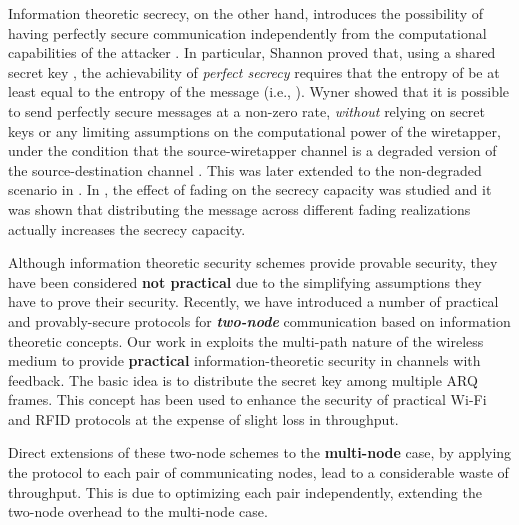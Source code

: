 \documentclass[10pt,letterpaper,conference]{IEEEtran}
\begin{document}
Information theoretic secrecy, on the other hand, introduces the possibility of
having perfectly secure communication independently from the computational
capabilities of the attacker \cite{Shannon49,Wyner75,Maurer93,Gopala06,Tang07,Omar09, Sabagh10, Sabagh11,forensic11,Elmorsy,Arora2009,karim_j,aly_j,multinode_demo}. In particular, Shannon \cite{Shannon49} proved
that, using a shared secret key ,  the achievability of \emph{perfect
secrecy} requires that the entropy of  be at least equal to the entropy of
the message  (i.e., ). Wyner showed that it is possible to
send perfectly secure messages at a non-zero rate, \textit{without} relying on
secret keys or any limiting assumptions on the computational power of the
wiretapper, under the condition that the source-wiretapper channel is a degraded
version of the source-destination channel \cite{Wyner75}. This was later
extended to the non-degraded scenario in \cite{Maurer93}. In
\cite{Gopala06,Tang07}, the effect of fading on the secrecy capacity was studied
and it was shown that distributing the message across different fading
realizations actually increases the secrecy capacity.

Although information theoretic security schemes provide provable security, they
have been considered \textbf{not practical} due to the simplifying assumptions
they have to prove their security. Recently, we have introduced a number
of practical and provably-secure protocols for \textbf{\emph{two-node}}
communication based on information theoretic concepts. Our work in \cite{Omar09,
Sabagh10, Sabagh11,forensic11} exploits the multi-path nature of the wireless
medium to provide \textbf{practical} information-theoretic security in channels
with feedback. The basic idea is to distribute the secret key among multiple ARQ
frames. This concept has been used to enhance the security of practical Wi-Fi
and RFID protocols at the expense of slight loss in throughput.

Direct extensions of these two-node schemes to the \textbf{multi-node} case, by applying
the protocol to each pair of communicating nodes, lead to a considerable waste
of throughput. This is due to optimizing each pair independently, extending the
two-node overhead to the multi-node case.
\end{document}
